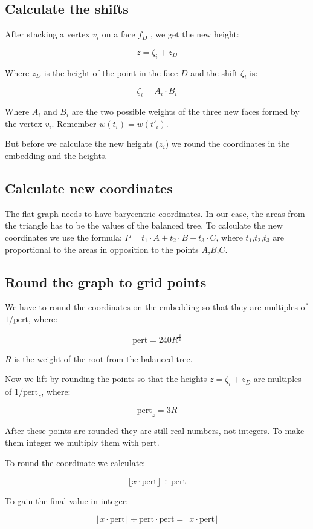 \subsection*{Calculate the shifts} 

After stacking a vertex $v_i$ on a face $f_D$ , we get the new height:

$$z= \zeta_i + z_D $$

Where $z_D$ is the height of the point in the face $D$ and the shift $\zeta_i$ is:

$$\zeta_i = A_i\cdot B_i$$

Where  $ A_i$ and $B_i$ are the two possible weights of the three new faces formed by the vertex $v_i$. Remember $w(t_i)= w(t'_i) $.

But before we calculate the new heights ($z_i$) we round the coordinates in the embedding and the heights.

\subsection*{Calculate new coordinates}

The flat graph needs to have barycentric coordinates. In our case, the areas from the triangle has to be the values of the balanced tree. To calculate the new coordinates we use the formula: $P = t_1\cdot A + t_2\cdot B + t_3\cdot C$, where $t_1$,$t_2$,$t_3$ are proportional to the areas in opposition to the points $A$,$B$,$C$.

\subsection*{Round the graph to grid points}

We have to round the coordinates on the embedding so that they are multiples of $1/\text{pert}$, where:

$$\text{pert}=240R^{\frac{3}{2}}$$

$R$ is the weight of the root from the balanced tree.

Now we lift by rounding the points so that the heights $z= \zeta_i + z_D $ are multiples of $1/\text{pert}_z$, where: 

$$\text{pert}_z=3R$$ 

After these points are rounded they are still real numbers, not integers. To make them integer we multiply them with pert.

To round the coordinate we calculate:

$$\lfloor x\cdot\text{pert}\rfloor \div \text{pert}$$

To gain the final value in integer:

$$\lfloor x\cdot\text{pert}\rfloor \div \text{pert} \cdot\text{pert} = \lfloor x\cdot\text{pert}\rfloor$$